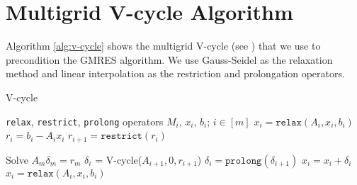 \section{Multigrid V-cycle Algorithm}
Algorithm \ref{alg:v-cycle} shows the multigrid V-cycle (see \citet{saad2003iterative}) that we use to precondition the GMRES algorithm.
We use Gauss-Seidel as the relaxation method and linear interpolation as the restriction and prolongation operators.
\begin{center}
\begin{algorithm}[h!]
   \caption{V-cycle}
   \label{alg:v-cycle}
\begin{algorithmic}
     \texttt{relax}, \texttt{restrict}, \texttt{prolong} operators
    $M_i$, $x_i$, $b_i$; $i \in[m]$
    \STATE $x_i = \texttt{relax}(A_i, x_i, b_i)$ 
    \STATE $r_i = b_i - A_i x_i$
    \STATE $r_{i+1} = \texttt{restrict}(r_i)$

        \STATE Solve $A_m \delta_m = r_m$
    \ELSE
        \STATE $\delta_i$ = V-cycle($A_{i+1}, 0, r_{i+1}$)
    \ENDIF
   \STATE $\delta_i = \texttt{prolong}(\delta_{i+1})$
   \STATE $x_i = x_i + \delta_i$
    \STATE $x_i = \texttt{relax}(A_i, x_i, b_i)$ 
\end{algorithmic}
\end{algorithm}
\end{center}

